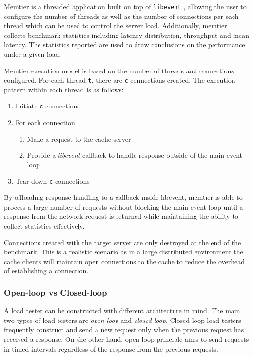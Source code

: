 Memtier is a threaded application built on top of \texttt{libevent} \cite{libevent}, allowing the user to configure the number of threads as well as the number of connections per each thread which can be used to control the server load. Additionally, memtier collects benchmark statistics including latency distribution, throughput and mean latency. The statistics reported are used to draw conclusions on the performance under a given load.

Memtier execution model is based on the number of threads and connections configured. For each thread \texttt{t}, there are \texttt{c} connections created. The execution pattern within each thread is as follows:

\begin{enumerate}
    \item Initiate \texttt{c} connections
    \item For each connection
        \begin{enumerate}
            \item Make a request to the cache server
            \item Provide a \textit{libevent} callback to handle response outside of the main event loop
        \end{enumerate}
    \item Tear down \texttt{c} connections
\end{enumerate}

By offloading response handling to a callback inside libevent, memtier is able to process a large number of requests without blocking the main event loop until a response from the network request is returned while maintaining the ability to collect statistics effectively.

Connections created with the target server are only destroyed at the end of the benchmark. This is a realistic scenario as in a large distributed environment the cache clients will maintain open connections to the cache to reduce the overhead of establishing a connection.


\subsubsection{Open-loop vs Closed-loop}
A load tester can be constructed with different architecture in mind. The main two types of load testers are \textit{open-loop} and \textit{closed-loop}. Closed-loop load testers frequently construct and send a new request only when the previous request has received a response. On the other hand, open-loop principle aims to send requests in timed intervals regardless of the response from the previous requests.

